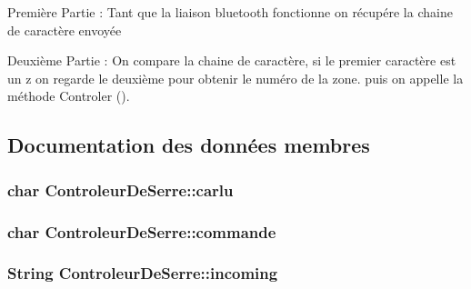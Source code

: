 Première Partie \+: Tant que la liaison bluetooth fonctionne on récupére la chaine de caractère envoyée

Deuxième Partie \+: On compare la chaine de caractère, si le premier caractère est un z on regarde le deuxième pour obtenir le numéro de la zone. puis on appelle la méthode Controler (). 

\subsection{Documentation des données membres}
\subsubsection[{\texorpdfstring{carlu}{carlu}}]{\setlength{\rightskip}{0pt plus 5cm}char Controleur\+De\+Serre\+::carlu\hspace{0.3cm}{\ttfamily [private]}}\hypertarget{class_controleur_de_serre_a193c19856f0c0b34cd405eabce6ddfab}{}\label{class_controleur_de_serre_a193c19856f0c0b34cd405eabce6ddfab}
\subsubsection[{\texorpdfstring{commande}{commande}}]{\setlength{\rightskip}{0pt plus 5cm}char Controleur\+De\+Serre\+::commande\hspace{0.3cm}{\ttfamily [private]}}\hypertarget{class_controleur_de_serre_adfb41079ae94c40c8eaeb784b485c018}{}\label{class_controleur_de_serre_adfb41079ae94c40c8eaeb784b485c018}
\subsubsection[{\texorpdfstring{incoming}{incoming}}]{\setlength{\rightskip}{0pt plus 5cm}String Controleur\+De\+Serre\+::incoming\hspace{0.3cm}{\ttfamily [private]}}\hypertarget{class_controleur_de_serre_aff14cbd8c5c61d76d592922ad81264d8}{}\label{class_controleur_de_serre_aff14cbd8c5c61d76d592922ad81264d8}
